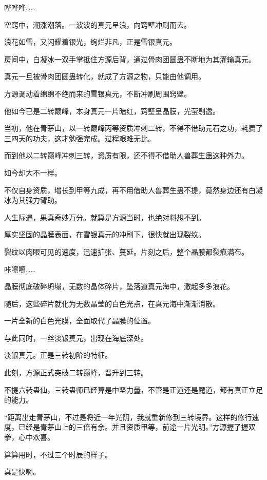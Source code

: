 
\begin{this_body}

哗哗哗……

空窍中，潮涨潮落。一波波的真元呈浪，向窍壁冲刷而去。

浪花如雪，又闪耀着银光，绚烂非凡，正是雪银真元。

房间中，白凝冰一双手掌抵住方源后背，通过骨肉团圆蛊不断地为其灌输真元。

真元一旦被骨肉团圆蛊转化，就成了方源之物，只能由他调用。

方源调动着绵绵不绝而来的雪银真元，不断冲刷周围窍壁。

他如今已是二转巅峰，本身真元一片暗红，窍壁呈晶膜，光莹剔透。

当初，他在青茅山，以一转巅峰丙等资质冲刺二转，不得不借助元石之功，耗费了三四天的功夫，这才勉强完成。过程艰难无比。

而到他以二转巅峰冲刺三转，资质有限，还不得不借助人兽葬生蛊这种外力。

如今却大不一样。

不仅自身资质，增长到甲等九成，再不用借助人兽葬生蛊不提，竟然身边还有白凝冰为其强力臂助。

人生际遇，果真奇妙万分。就算是方源当时，也绝对料想不到。

厚实坚固的晶膜表面，在雪银真元的冲刷下，很快就出现裂纹。

裂纹以肉眼可见的速度，迅速扩张、蔓延。片刻之后，整个晶膜都裂痕满布。

咔嚓嚓……

晶膜彻底破碎坍塌，无数的晶体碎片，坠落道真元海中，激起多多浪花。

随后，这些碎片就化为无数晶莹的白色光点，在真元海中渐渐消散。

一片全新的白色光膜，全面取代了晶膜的位置。

与此同时，一丝淡银真元，出现在海底深处。

淡银真元。正是三转初阶的特征。

此刻，方源正式突破二转巅峰，晋升到三转。

不提六转蛊仙，三转蛊师已经算是中坚力量，不管是正道还是魔道，都有真正立足的能力。

“距离出走青茅山，不过是将近一年光阴，我就重新修到三转境界。这样的修行速度，已经是青茅山上的三倍有余。并且资质甲等，前途一片光明。”方源握了握双拳，心中欢喜。

算算用时，不过三个时辰的样子。

真是快啊。


\end{this_body}
